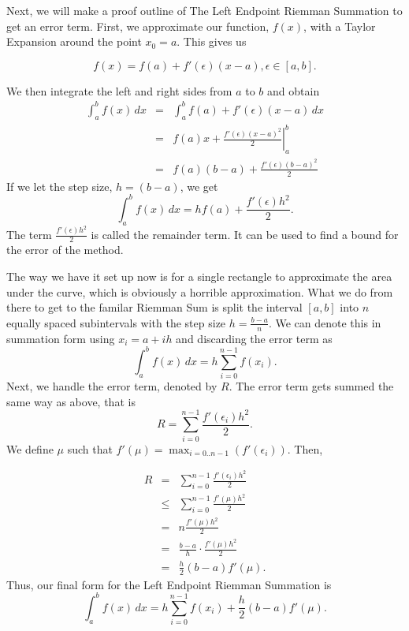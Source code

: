 \documentclass[12pt]{article}
\newcommand{\integral}[3]{\text{$\int^{#2}_{#1} #3\,dx$}}
\newcommand{\summation}[3]{\text{$\sum^{#2}_{#1} #3$}}
\begin{document}
\noindent Next, we will make a proof outline of The Left Endpoint Riemman Summation to get an error term. First, we approximate our function, $f(x)$, with a Taylor Expansion around the point $x_0 = a$. This gives us

\begin{equation*} f(x) = f(a) + f'(\epsilon)(x - a), \epsilon\in[a,b]. \end{equation*}

\noindent We then integrate the left and right sides from $a$ to $b$ and obtain
\begin{eqnarray*}  \integral{a}{b}{f(x)} &=& \integral{a}{b}{f(a) + f'(\epsilon)(x - a)}  \\
&=& \left. f(a)x + \frac{f'(\epsilon)(x - a)^2}{2}\right|_a^b \\
&=& f(a)(b - a) + \frac{f'(\epsilon)(b - a)^2}{2}
\end{eqnarray*}
If we let the step size, $h = (b - a)$, we get 
\begin{equation*} \integral{a}{b}{f(x)} = hf(a) + \frac{f'(\epsilon)h^2}{2}. \end{equation*}
The term $\frac{f'(\epsilon)h^2}{2}$ is called the remainder term. It can be used to find a bound for the error of the method.

The way we have it set up now is for a single rectangle to approximate the area under the curve, which is obviously a horrible approximation. What we do from there to get to the familar Riemman Sum is split the interval $[a,b]$ into $n$ equally spaced subintervals with the step size $h = \frac{b-a}{n}$. We can denote this in summation form using $x_i = a + ih$ and discarding the error term as
\begin{equation*} \integral{a}{b}{f(x)} = h\summation{i = 0}{n - 1}{f(x_i)}. \end{equation*}
Next, we handle the error term, denoted by $R$. The error term gets summed the same way as above, that is
\begin{equation*} R = \summation{i = 0}{n - 1}{\frac{{f'(\epsilon_i)}h^2}{2}}. \end{equation*}
We define $\mu$ such that $f'(\mu)=\displaystyle\max_{i=0..n-1}(f'(\epsilon_i))$. Then, 

\begin{eqnarray*} R &=& \summation{i = 0}{n - 1}{\frac{{f'(\epsilon_i)}h^2}{2}} \\
&\leq& \summation{i = 0}{n - 1}{\frac{{f'(\mu)}h^2}{2}} \\
&=& n\frac{{f'(\mu)}h^2}{2} \\
&=& \frac{b-a}{h}\cdot\frac{{f'(\mu)}h^2}{2} \\
&=& \frac{h}{2}(b-a)f'(\mu).
\end{eqnarray*}
Thus, our final form for the Left Endpoint Riemman Summation is 
\begin{equation*} 
\integral{a}{b}{f(x)} = h\summation{i = 0}{n - 1}{f(x_i)} + \frac{h}{2}(b-a)f'(\mu).
\end{equation*}
\end{document}
